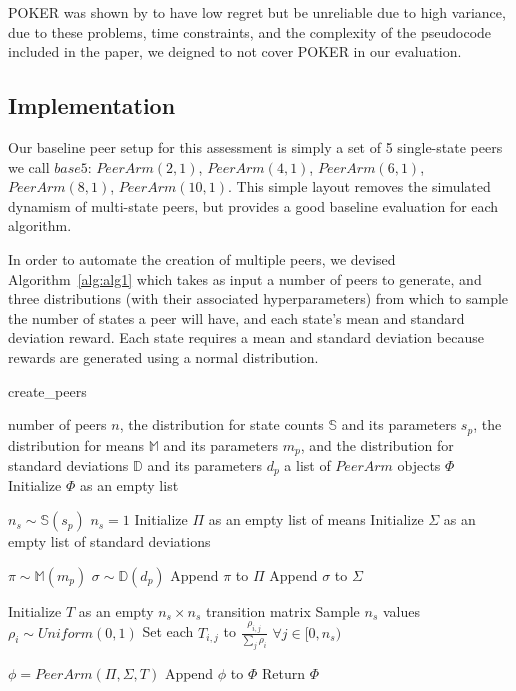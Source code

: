 \documentclass{article}
\begin{document}


POKER was shown by \cite{muMAB_wireless} to have low regret but be unreliable due to high variance, due to these problems, time constraints, and the complexity of the 
pseudocode included in the paper, we deigned to not cover POKER in our evaluation.


\subsection{Implementation}
Our baseline peer setup for this assessment is simply a set of 5 single-state peers we call $base5$: $PeerArm(2,1)$, $PeerArm(4,1)$, $PeerArm(6,1)$, $PeerArm(8,1)$, 
$PeerArm(10,1)$. This simple layout removes the simulated dynamism of multi-state peers, but provides a good baseline evaluation for each algorithm. 

In order to automate the creation of multiple peers, we devised Algorithm~\ref{alg:alg1} which takes as input a number of peers to generate, and three distributions (with 
their associated hyperparameters) from which to sample the number of states a peer will have, and each state's mean and standard deviation reward. Each state requires a 
mean and standard deviation because rewards are generated using a normal distribution. 

\begin{algorithm}[tb]
    \caption{create\_peers}
    \label{alg:alg1}
\begin{algorithmic}
     number of peers $n$, the distribution for state counts $\mathbb{S}$ and its parameters $s_p$, the distribution for means $\mathbb{M}$ and 
    its parameters $m_p$, and the distribution for standard deviations $\mathbb{D}$ and its parameters $d_p$
     a list of $PeerArm$ objects $\Phi$
    \STATE Initialize $\Phi$ as an empty list
    
    \STATE $n_s \sim \mathbb{S}(s_p)$
    \STATE $n_s = 1$
    \ENDIF
    \STATE Initialize $\Pi$ as an empty list of means
    \STATE Initialize $\Sigma$ as an empty list of standard deviations

    \STATE $\pi \sim \mathbb{M}(m_p)$
    \STATE $\sigma \sim \mathbb{D}(d_p)$
    \STATE Append $\pi$ to $\Pi$
    \STATE Append $\sigma$ to $\Sigma$
    \ENDFOR

    \STATE Initialize $T$ as an empty $n_s \times n_s$ transition matrix
    \STATE Sample $n_s$ values $\rho_i \sim Uniform(0, 1)$
    \STATE Set each $T_{i,j}$ to $\frac{\rho_{i,j}}{\sum_j\rho_i}$ $\forall j \in [0, n_s)$
    \ENDFOR

    \STATE $\phi = PeerArm(\Pi, \Sigma, T)$
    \STATE Append $\phi$ to $\Phi$
    \ENDFOR
    \STATE Return $\Phi$
\end{algorithmic}
\end{algorithm}
\end{document}
